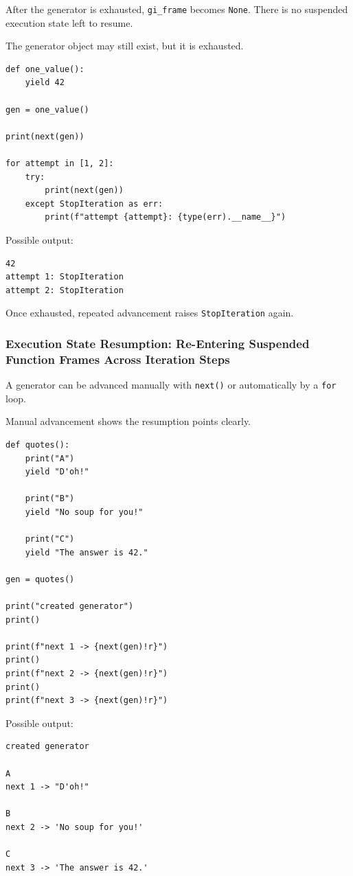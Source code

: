 After the generator is exhausted, \texttt{gi\_frame} becomes \texttt{None}. There is no suspended execution state left to resume.

The generator object may still exist, but it is exhausted.

\begin{verbatim}
def one_value():
    yield 42

gen = one_value()

print(next(gen))

for attempt in [1, 2]:
    try:
        print(next(gen))
    except StopIteration as err:
        print(f"attempt {attempt}: {type(err).__name__}")
\end{verbatim}

Possible output:

\begin{verbatim}
42
attempt 1: StopIteration
attempt 2: StopIteration
\end{verbatim}

Once exhausted, repeated advancement raises \texttt{StopIteration} again.

\subsubsection{Execution State Resumption: Re-Entering Suspended Function Frames Across Iteration Steps}

A generator can be advanced manually with \texttt{next()} or automatically by a \texttt{for} loop.

Manual advancement shows the resumption points clearly.

\begin{verbatim}
def quotes():
    print("A")
    yield "D'oh!"

    print("B")
    yield "No soup for you!"

    print("C")
    yield "The answer is 42."

gen = quotes()

print("created generator")
print()

print(f"next 1 -> {next(gen)!r}")
print()
print(f"next 2 -> {next(gen)!r}")
print()
print(f"next 3 -> {next(gen)!r}")
\end{verbatim}

Possible output:

\begin{verbatim}
created generator

A
next 1 -> "D'oh!"

B
next 2 -> 'No soup for you!'

C
next 3 -> 'The answer is 42.'
\end{verbatim}

